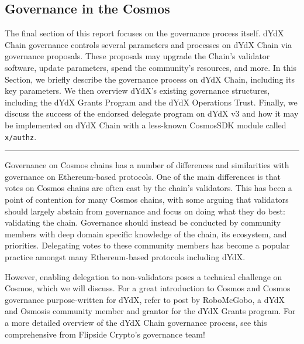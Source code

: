 \begin{fullwidth}
    \section{Governance in the Cosmos} \label{sec:governance}

    \begin{adjustwidth}{2cm}{2cm}
        \justify
        The final section of this report focuses on the governance process itself. dYdX Chain governance controls several parameters and processes on dYdX Chain via governance proposals. These proposals may upgrade the Chain's validator software, update parameters, spend the community's resources, and more. In this Section, we briefly describe the governance process on dYdX Chain, including its key parameters. We then overview dYdX's existing governance structures, including the dYdX Grants Program and the dYdX Operations Trust. Finally, we discuss the success of the endorsed delegate program on dYdX v3 and how it may be implemented on dYdX Chain with a less-known CosmosSDK module called \texttt{x/authz}.
    \end{adjustwidth}
    
    \textcolor{gray}{\rule{\linewidth}{0.1mm}}
\end{fullwidth}

    Governance on Cosmos chains has a number of differences and similarities with governance on Ethereum-based protocols. One of the main differences is that votes on Cosmos chains are often cast by the chain's validators. This has been a point of contention for many Cosmos chains, with some arguing that validators should largely abstain from governance and focus on doing what they do best: validating the chain. Governance should instead be conducted by community members with deep domain specific knowledge of the chain, its ecosystem, and priorities. Delegating votes to these community members has become a popular practice amongst many Ethereum-based protocols including dYdX. 

    However, enabling delegation to non-validators poses a technical challenge on Cosmos, which we will discuss. For a great introduction to Cosmos and Cosmos governance purpose-written for dYdX, refer to  post by RoboMcGobo, a dYdX and Osmosis community member and grantor for the dYdX Grants program. For a more detailed overview of the dYdX Chain governance process, see this comprehensive  from Flipside Crypto's governance team!

